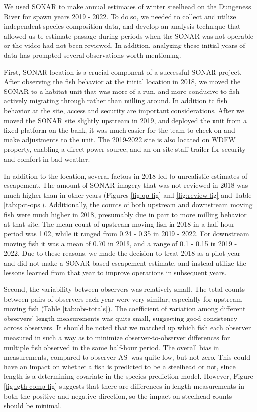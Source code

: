 \documentclass[
]{article}
\begin{document}
We used SONAR to make annual estimates of winter steelhead on the Dungeness River for spawn years 2019 - 2022. To do so, we needed to collect and utilize independent species composition data, and develop an analysis technique that allowed us to estimate passage during periods when the SONAR was not operable or the video had not been reviewed. In addition, analyzing these initial years of data has prompted several observations worth mentioning.

First, SONAR location is a crucial component of a successful SONAR project. After observing the fish behavior at the initial location in 2018, we moved the SONAR to a habitat unit that was more of a run, and more conducive to fish actively migrating through rather than milling around. In addition to fish behavior at the site, access and security are important considerations. After we moved the SONAR site slightly upstream in 2019, and deployed the unit from a fixed platform on the bank, it was much easier for the team to check on and make adjustments to the unit. The 2019-2022 site is also located on WDFW property, enabling a direct power source, and an on-site staff trailer for security and comfort in bad weather.

In addition to the location, several factors in 2018 led to unrealistic estimates of escapement. The amount of SONAR imagery that was not reviewed in 2018 was much higher than in other years (Figures \ref{fig:op-fig} and \ref{fig:review-fig} and Table \ref{tab:pct-ops}). Additionally, the counts of both upstream and downstream moving fish were much higher in 2018, presumably due in part to more milling behavior at that site. The mean count of upstream moving fish in 2018 in a half-hour period was 1.02, while it ranged from 0.24 - 0.35 in 2019 - 2022. For downstream moving fish it was a mean of 0.70 in 2018, and a range of 0.1 - 0.15 in 2019 - 2022. Due to these reasons, we made the decision to treat 2018 as a pilot year and did not make a SONAR-based escapement estimate, and instead utilize the lessons learned from that year to improve operations in subsequent years.

Second, the variability between observers was relatively small. The total counts between pairs of observers each year were very similar, especially for upstream moving fish (Table \ref{tab:obs-totals}). The coefficient of variation among different observers' length measurements was quite small, suggesting good consistency across observers. It should be noted that we matched up which fish each observer measured in such a way as to minimize observer-to-observer differences for multiple fish observed in the same half-hour period. The overall bias in measurements, compared to observer AS, was quite low, but not zero. This could have an impact on whether a fish is predicted to be a steelhead or not, since length is a determining covariate in the species prediction model. However, Figure \ref{fig:lgth-comp-fig} suggests that there are differences in length measurements in both the positive and negative direction, so the impact on steelhead counts should be minimal.
\end{document}
